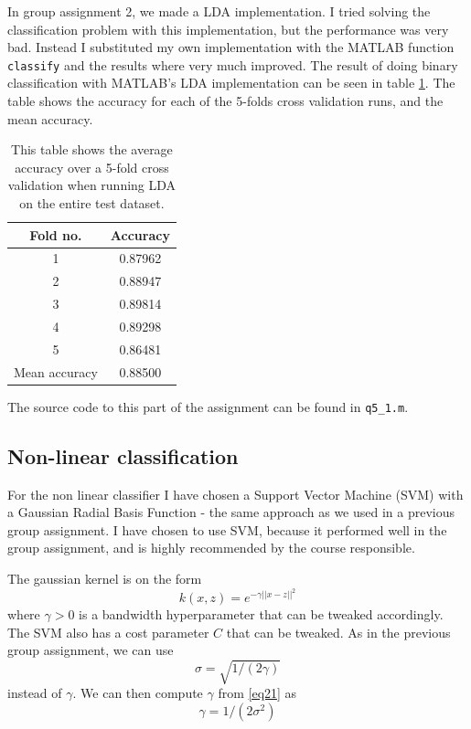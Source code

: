 \documentclass[10pt]{article}
\begin{document}
In group assignment 2, we made a LDA implementation\cite{assignment2}. I tried solving the classification problem with this implementation, but the performance was very bad. Instead I substituted my own implementation with the MATLAB function \texttt{classify} and the results where very much improved. The result of doing binary classification with MATLAB's LDA implementation can be seen in table \ref{table10}. The table shows the accuracy for each of the 5-folds cross validation runs, and the mean accuracy.

\begin{table}
  \begin{center}  
    \begin{tabular}{ | c | c |}
      \hline
      Fold no. & Accuracy\\
      \hline
      1    &     0.87962\\
      2    &     0.88947\\
      3    &     0.89814\\
      4    &     0.89298\\
      5    &     0.86481\\
      \hline
      Mean accuracy &  0.88500\\
      \hline
    \end{tabular}
    \caption{This table shows the average accuracy over a 5-fold cross validation when running LDA on the entire test dataset.}
    \label{table10}
  \end{center}    
\end{table}   

The source code to this part of the assignment can be found in \texttt{q5\_1.m}.


\subsection*{Non-linear classification} %
\label{sub:non_linear_classification}
For the non linear classifier I have chosen a Support Vector Machine (SVM) with a Gaussian Radial Basis Function - the same approach as we used in a previous group assignment\cite{assignment3}. I have chosen to use SVM, because it performed well in the group assignment, and is highly recommended by the course responsible.

The gaussian kernel is on the form 
\begin{equation}
  k(x,z) = e^{-\gamma||x-z||^2}
\end{equation}
where $\gamma>0$ is a bandwidth hyperparameter that can be tweaked accordingly. The SVM also has a cost parameter $C$ that can be tweaked. As in the previous group assignment, we can use 
\begin{equation}
  \sigma = \sqrt{1/(2\gamma)}
  \label{eq21}
\end{equation}
instead of $\gamma$. We can then compute $\gamma$ from \ref{eq21} as
\begin{equation}
  \gamma = 1/(2\sigma^2)  
\end{equation} 
\end{document}
